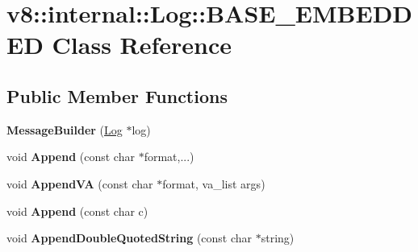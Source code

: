 \hypertarget{classv8_1_1internal_1_1_log_1_1_b_a_s_e___e_m_b_e_d_d_e_d}{}\section{v8\+:\+:internal\+:\+:Log\+:\+:B\+A\+S\+E\+\_\+\+E\+M\+B\+E\+D\+D\+E\+D Class Reference}
\label{classv8_1_1internal_1_1_log_1_1_b_a_s_e___e_m_b_e_d_d_e_d}
\subsection*{Public Member Functions}
\begin{DoxyCompactItemize}
\item 
\hypertarget{classv8_1_1internal_1_1_log_1_1_b_a_s_e___e_m_b_e_d_d_e_d_a5cd1e2e5253b4bb18d76abd5b3be545f}{}{\bfseries Message\+Builder} (\hyperlink{classv8_1_1internal_1_1_log}{Log} $\ast$log)\label{classv8_1_1internal_1_1_log_1_1_b_a_s_e___e_m_b_e_d_d_e_d_a5cd1e2e5253b4bb18d76abd5b3be545f}

\item 
\hypertarget{classv8_1_1internal_1_1_log_1_1_b_a_s_e___e_m_b_e_d_d_e_d_a6c7a832a19d180085c3760d9a2ea12d4}{}void {\bfseries Append} (const char $\ast$format,...)\label{classv8_1_1internal_1_1_log_1_1_b_a_s_e___e_m_b_e_d_d_e_d_a6c7a832a19d180085c3760d9a2ea12d4}

\item 
\hypertarget{classv8_1_1internal_1_1_log_1_1_b_a_s_e___e_m_b_e_d_d_e_d_a2e7f589ec1a25bbd4e9019d230e45cff}{}void {\bfseries Append\+V\+A} (const char $\ast$format, va\+\_\+list args)\label{classv8_1_1internal_1_1_log_1_1_b_a_s_e___e_m_b_e_d_d_e_d_a2e7f589ec1a25bbd4e9019d230e45cff}

\item 
\hypertarget{classv8_1_1internal_1_1_log_1_1_b_a_s_e___e_m_b_e_d_d_e_d_a5cfb7887d4ab3e292d0f662dee92a14b}{}void {\bfseries Append} (const char c)\label{classv8_1_1internal_1_1_log_1_1_b_a_s_e___e_m_b_e_d_d_e_d_a5cfb7887d4ab3e292d0f662dee92a14b}

\item 
\hypertarget{classv8_1_1internal_1_1_log_1_1_b_a_s_e___e_m_b_e_d_d_e_d_a27f32f415acfd6b4587d0444eb83adc2}{}void {\bfseries Append\+Double\+Quoted\+String} (const char $\ast$string)\label{classv8_1_1internal_1_1_log_1_1_b_a_s_e___e_m_b_e_d_d_e_d_a27f32f415acfd6b4587d0444eb83adc2}


\end{DoxyCompactItemize}
